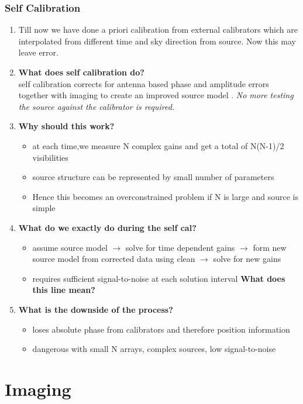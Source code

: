 \documentclass[10pt]{report}
\newcommand{\tbf}[1]{\textbf{#1}}
\newcommand{\tit}[1]{\textit{#1}}
\begin{document}
\subsubsection{Self Calibration}
\begin{enumerate}
\item Till now we have done a priori calibration from external calibrators which are interpolated from
different time and sky direction from source. Now this may leave error.
\item \tbf{What does self calibration do?}\\

self calibration corrects for antenna based phase and amplitude errors together with imaging to create an improved source model . \tit{No more testing the source against the calibrator is required.}

\item \tbf{Why should this work?}\\
\begin{itemize}
\item at each time,we measure N complex gains and get a total of N(N-1)/2 visibilities
\item source structure can be represented by small number of parameters
\item Hence this becomes an overconstrained problem if N is large and source is simple
\end{itemize}
\item \tbf{What do we exactly do during the self cal?}\\
\begin{itemize}
\item assume source model $\rightarrow$ solve for time dependent gains $\rightarrow$ form new source model from corrected data using clean $\rightarrow$ solve for new gains
\item requires sufficient signal-to-noise at each solution interval \tbf{What does this line mean?}
\end{itemize}
\item \tbf{What is the downside of the process?}
\begin{itemize}
\item loses absolute phase from calibrators and therefore position information
\item dangerous with small N arrays, complex sources, low signal-to-noise
\end{itemize}
\end{enumerate}
\newpage
\section{Imaging}
\end{document}
